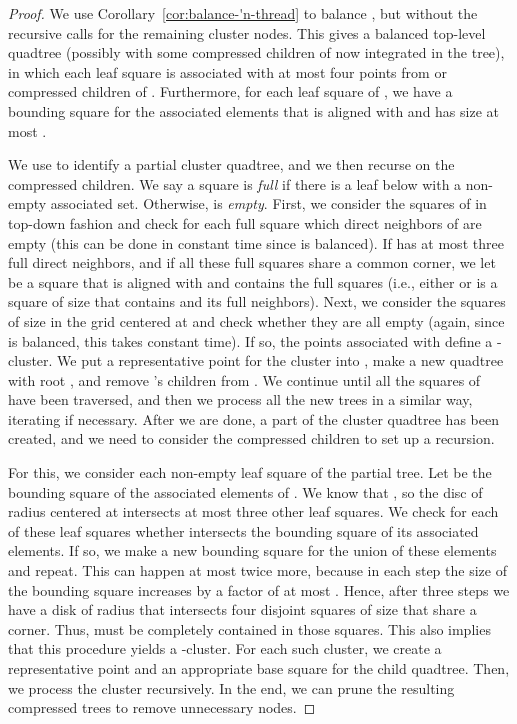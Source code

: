 \documentclass[11pt]{paper}
\begin{document}
    \begin{proof} 
      We use 
      Corollary~\ref{cor:balance-'n-thread} to balance , 
      but without the recursive calls for the remaining cluster
      nodes. This gives a balanced top-level quadtree  
      (possibly with some compressed children of  now 
      integrated in the tree), in which each leaf square is  
      associated with at most four points from  or compressed
      children of . Furthermore, for each leaf square  of ,
      we have a bounding square for the associated elements
      that is aligned with  and has size at most 
      . 

      We use  to identify a partial 
      cluster quadtree, and we then recurse on the 
      compressed children.
      We say a square  is \emph{full} if 
      there is a leaf below  with a non-empty associated set.
      Otherwise,  is \emph{empty}.
      First, we consider the squares of  in top-down
      fashion and check for each
      full square  which direct neighbors of  
      are empty  (this can
      be done in constant time since  is balanced). If  has
      at most three full direct neighbors, and if all these
      full squares share a common corner,
      we let  be a square that
      is aligned with  and contains the full squares (i.e., either
       or  is a square of size  that contains  and
      its full neighbors). Next, we 
      consider the squares of size  in
      the  grid centered at 
      and check whether they are all empty (again, since  is balanced,
      this takes constant time).
      If so, the points associated with 
      define a -cluster. We put a representative
      point for the cluster into , make a new quadtree with root ,
      and remove 's children from .
      We continue until all the squares of  have been traversed,
      and then we process all the new trees in a similar way, iterating
      if necessary. After we are done, a part of the cluster quadtree has
      been created, and we need to consider the compressed children
      to set up a recursion.

      For this, we consider each non-empty leaf square  of the partial tree.
      Let  be the bounding square of the associated elements of .
      We know that , so the disc  of radius  
      centered at  intersects at most three other leaf squares. 
      We check for each of these leaf squares whether  intersects
      the bounding square of its associated elements.
      If so, we make a new bounding square for the union of these elements and
      repeat. This can happen at most twice more, because in each step
      the size of the bounding square increases by a factor of at most .
      Hence, after three steps we have a disk  of 
      radius  that 
      intersects four disjoint squares of size  that share a
      corner. Thus,  must be completely contained in those squares. 
      This also implies that this procedure yields a
      -cluster.  For each such cluster, we 
      create a representative point and
      an appropriate base square for the child quadtree. 
      Then, we process the cluster
      recursively. In the end, we can prune the resulting compressed
      trees to remove unnecessary nodes.


\end{proof}
\end{document}
